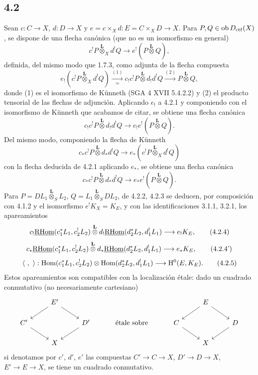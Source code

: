 \subsection*{4.2}
Sean $c:C\to X$, $d:D\to X$ y $e=c\times_Xd:E=C\times_XD\to X$. Para $P,Q\in\operatorname{ob}D_{\mathrm{ctf}}(X)$, se dispone de una flecha canónica (que no es un isomorfismo en general)
\begin{equation}
c^!P\overset{\mathbf L}{\otimes}_X d^!Q
\longrightarrow e^!(P\overset{\mathbf L}{\otimes}Q),
\tag{4.2.1}
\end{equation}
definida, del mismo modo que 1.7.3, como adjunta de la flecha compuesta
\[
e_!(c^!P\overset{\mathbf L}{\otimes}_X d^!Q)
\xrightarrow[\simeq]{(1)}
 c_!c^!P\overset{\mathbf L}{\otimes}d_!d^!Q
\xrightarrow{(2)} P\overset{\mathbf L}{\otimes}Q,
\]
donde (1) es el isomorfismo de Künneth (SGA 4 XVII 5.4.2.2) y (2) el producto tensorial de las flechas de adjunción. Aplicando $e_!$ a 4.2.1 y componiendo con el isomorfismo de Künneth que acabamos de citar, se obtiene una flecha canónica
\begin{equation}
c_!c^!P\overset{\mathbf L}{\otimes}d_!d^!Q
\longrightarrow e_!e^!(P\overset{\mathbf L}{\otimes}Q).
\tag{4.2.2}
\end{equation}
Del mismo modo, componiendo la flecha de Künneth
\[
c_*c^!P\overset{\mathbf L}{\otimes}d_*d^!Q
\longrightarrow e_*(c^!P\overset{\mathbf L}{\otimes}_X d^!Q)
\]
con la flecha deducida de 4.2.1 aplicando $e_*$, se obtiene una flecha canónica
\begin{equation}
c_*c^!P\overset{\mathbf L}{\otimes}d_*d^!Q
\longrightarrow e_*e^!(P\overset{\mathbf L}{\otimes}Q).
\tag{4.2.3}
\end{equation}
Para $P=DL_1\overset{\mathbf L}{\otimes}_S L_2$, $Q=L_1\overset{\mathbf L}{\otimes}_S DL_2$, de 4.2.2, 4.2.3 se deducen, por composición con 4.1.2 y el isomorfismo $e^!K_X=K_E$, y con las identificaciones 3.1.1, 3.2.1, los apareamientos
\begin{equation}
c_!\underline{\mathrm{RHom}}(c_1^*L_1,c_2^!L_2)\overset{\mathbf L}{\otimes}
 d_!\underline{\mathrm{RHom}}(d_2^*L_2,d_1^!L_1)
\longrightarrow e_!K_E,
\tag{4.2.4}
\end{equation}
\begin{equation}
c_*\underline{\mathrm{RHom}}(c_1^*L_1,c_2^!L_2)\overset{\mathbf L}{\otimes}
 d_*\underline{\mathrm{RHom}}(d_2^*L_2,d_1^!L_1)
\longrightarrow e_*K_E,
\tag{4.2.4'}
\end{equation}
\begin{equation}
\langle\ ,\ \rangle:
\operatorname{Hom}(c_1^*L_1,c_2^!L_2)\otimes\operatorname{Hom}(d_2^*L_2,d_1^!L_1)
\longrightarrow \mathrm{H}^0(E,K_E).
\tag{4.2.5}
\end{equation}
Estos apareamientos son compatibles con la localización étale: dado un cuadrado conmutativo (no necesariamente cartesiano)
\[
\begin{tikzcd}[column sep=2.5em,row sep=1.5em]
& E' \arrow[dl] \arrow[dr] & && & E \arrow[dl] \arrow[dr] & \\
C' \arrow[dr] && D' \arrow[dl] & \text{ étale sobre } & C \arrow[dr] && D \arrow[dl] \\
& X &&&& X &
\end{tikzcd}
\]
si denotamos por $c'$, $d'$, $e'$ las compuestas $C'\to C\to X$, $D'\to D\to X$, $E'\to E\to X$, se tiene un cuadrado conmutativo.


